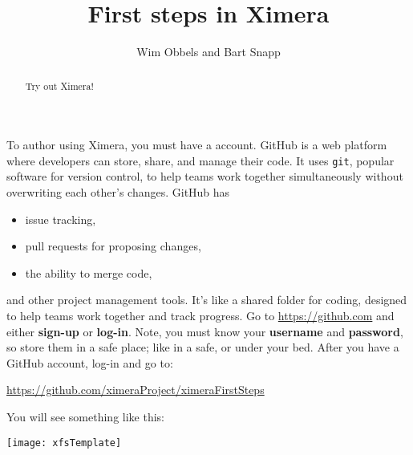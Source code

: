 \documentclass{ximera}
\author{Wim Obbels and Bart Snapp}
\title{First steps in Ximera}
\begin{document}
        \begin{abstract}
            Try out Ximera!
        \end{abstract}
        \maketitle

        To author using Ximera, you must have a 
        account. GitHub is a web platform where developers can store, share,
        and manage
        their code. It uses \verb!git!, popular software for version control,
        to help
        teams work together simultaneously without overwriting each other's
        changes.
        GitHub has
        \begin{itemize}
            \item issue tracking,
            \item pull requests for proposing changes,
            \item the ability to merge code,
        \end{itemize}
        and other project management tools. It's like a shared folder for
        coding, designed to
        help teams work together and track progress. Go to
        \url{https://github.com} and
        either \textbf{sign-up} or \textbf{log-in}. Note, you must know your \textbf{username}
        and
        \textbf{password}, so store them in a safe place; like in a safe, or
        under your
        bed. After you have a GitHub account, log-in and go to:
        \begin{center}
            \url{https://github.com/ximeraProject/ximeraFirstSteps}
        \end{center}
        You will see something like this:
        \pdfOnly{\end{multicols}}\enlargethispage{1.5em}
\begin{image}
    \texttt{[image: xfsTemplate]}
\end{image}
\newpage
\end{document}
